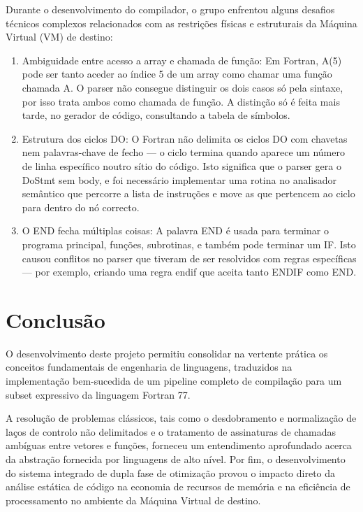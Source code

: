\documentclass[12pt, a4paper]{article}
\begin{document}
Durante o desenvolvimento do compilador, o grupo enfrentou alguns desafios técnicos complexos relacionados com as restrições físicas e estruturais da Máquina Virtual (VM) de destino:

\begin{enumerate}
    \item Ambiguidade entre acesso a array e chamada de função: Em Fortran, A(5) pode ser tanto aceder ao índice 5 de um array como chamar uma função chamada A. O parser não consegue distinguir os dois casos só pela sintaxe, por isso trata ambos como chamada de função. A distinção só é feita mais tarde, no gerador de código, consultando a tabela de símbolos.
    \item Estrutura dos ciclos DO: O Fortran não delimita os ciclos DO com chavetas nem palavras-chave de fecho — o ciclo termina quando aparece um número de linha específico noutro sítio do código. Isto significa que o parser gera o DoStmt sem body, e foi necessário implementar uma rotina no analisador semântico que percorre a lista de instruções e move as que pertencem ao ciclo para dentro do nó correcto.
    \item O END fecha múltiplas coisas: A palavra END é usada para terminar o programa principal, funções, subrotinas, e também pode terminar um IF. Isto causou conflitos no parser que tiveram de ser resolvidos com regras específicas — por exemplo, criando uma regra endif que aceita tanto ENDIF como END.
    
\end{enumerate}

\section{Conclusão}
O desenvolvimento deste projeto permitiu consolidar na vertente prática os conceitos fundamentais de engenharia de linguagens, traduzidos na implementação bem-sucedida de um pipeline completo de compilação para um subset expressivo da linguagem Fortran 77. 

A resolução de problemas clássicos, tais como o desdobramento e normalização de laços de controlo não delimitados e o tratamento de assinaturas de chamadas ambíguas entre vetores e funções, forneceu um entendimento aprofundado acerca da abstração fornecida por linguagens de alto nível. Por fim, o desenvolvimento do sistema integrado de dupla fase de otimização provou o impacto direto da análise estática de código na economia de recursos de memória e na eficiência de processamento no ambiente da Máquina Virtual de destino.
\end{document}
